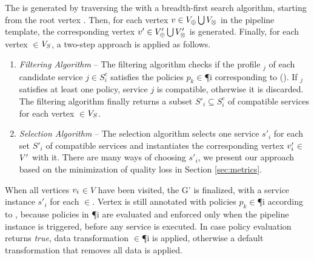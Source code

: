     The \pipelineInstance  is generated by traversing the \pipelineTemplate with a breadth-first search algorithm, starting from the root vertex .
    Then, for each vertex $v\in V_{\oplus}\bigcup V_{\otimes}$ in the pipeline template, the corresponding vertex $v'\in V'_{\oplus}\bigcup V'_{\otimes}$ is generated.
    Finally, for each vertex $\in$$V_S$, a two-step approach is applied as follows.

  \begin{enumerate}

    \item \textit{Filtering Algorithm} -- The filtering algorithm checks if the profile \profile$_j$ of each candidate service $\si{j}$$\in$$S^c_{i}$ satisfies the policies $p_k$$\in$\P{i} corresponding to \myLambda(). If \profile$_j$ satisfies at least one policy,  service $\si{j}$ is compatible, otherwise it is discarded. The filtering algorithm finally returns a subset $S'_{i}$$\subseteq$$S^c_{i}$ of compatible services for each vertex $\in$$V_S$.
    \item \textit{Selection Algorithm} -- The selection algorithm selects one service $s'_i$ for each set $S'_{i}$ of compatible services and instantiates the corresponding vertex $v'_{i}$$\in$$V'$ with it. There are many ways of choosing $s'_i$, we present our approach based on the minimization of quality loss in Section \ref{sec:metrics}.
  \end{enumerate}

  When all vertices $v_{i}$$\in$$V$ have been visited, the \pipelineInstance G' is finalized, with a service instance $s'_i$ for each $\in$\Vp. Vertex  is still annotated with policies $p_k$$\in$\P{i} according to \myLambda, because policies in \P{i} are evaluated and enforced only when the pipeline instance is triggered, before any service is executed. In case policy evaluation returns \emph{true}, data transformation \TP$\in$\P{i} is applied, otherwise a default transformation that removes all data is applied.

